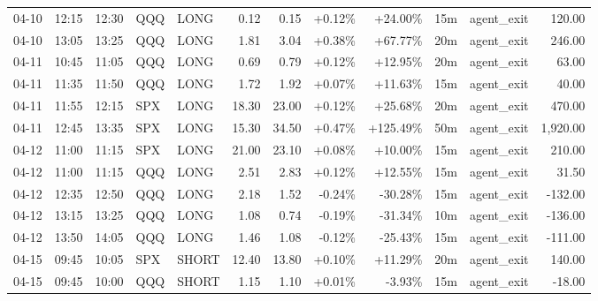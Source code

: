 \documentclass[11pt,a4paper]{article}
\begin{document}
\begin{center}
\begin{longtable}{>{\color{txtmain}}l l l l l r r r r r >{\color{txtmain}}l r}
04-10 & 12:15 & 12:30 & QQQ & LONG & 0.12 & 0.15 & \textcolor{wingreen}{+0.12\%} & \textcolor{wingreen}{+24.00\%} & 15m & agent\_exit & \textcolor{wingreen}{120.00} \\
04-10 & 13:05 & 13:25 & QQQ & LONG & 1.81 & 3.04 & \textcolor{wingreen}{+0.38\%} & \textcolor{wingreen}{+67.77\%} & 20m & agent\_exit & \textcolor{wingreen}{246.00} \\
04-11 & 10:45 & 11:05 & QQQ & LONG & 0.69 & 0.79 & \textcolor{wingreen}{+0.12\%} & \textcolor{wingreen}{+12.95\%} & 20m & agent\_exit & \textcolor{wingreen}{63.00} \\
04-11 & 11:35 & 11:50 & QQQ & LONG & 1.72 & 1.92 & \textcolor{wingreen}{+0.07\%} & \textcolor{wingreen}{+11.63\%} & 15m & agent\_exit & \textcolor{wingreen}{40.00} \\
04-11 & 11:55 & 12:15 & SPX & LONG & 18.30 & 23.00 & \textcolor{wingreen}{+0.12\%} & \textcolor{wingreen}{+25.68\%} & 20m & agent\_exit & \textcolor{wingreen}{470.00} \\
04-11 & 12:45 & 13:35 & SPX & LONG & 15.30 & 34.50 & \textcolor{wingreen}{+0.47\%} & \textcolor{wingreen}{+125.49\%} & 50m & agent\_exit & \textcolor{wingreen}{1,920.00} \\
04-12 & 11:00 & 11:15 & SPX & LONG & 21.00 & 23.10 & \textcolor{wingreen}{+0.08\%} & \textcolor{wingreen}{+10.00\%} & 15m & agent\_exit & \textcolor{wingreen}{210.00} \\
04-12 & 11:00 & 11:15 & QQQ & LONG & 2.51 & 2.83 & \textcolor{wingreen}{+0.12\%} & \textcolor{wingreen}{+12.55\%} & 15m & agent\_exit & \textcolor{wingreen}{31.50} \\
04-12 & 12:35 & 12:50 & QQQ & LONG & 2.18 & 1.52 & \textcolor{lossred}{-0.24\%} & \textcolor{lossred}{-30.28\%} & 15m & agent\_exit & \textcolor{lossred}{-132.00} \\
04-12 & 13:15 & 13:25 & QQQ & LONG & 1.08 & 0.74 & \textcolor{lossred}{-0.19\%} & \textcolor{lossred}{-31.34\%} & 10m & agent\_exit & \textcolor{lossred}{-136.00} \\
04-12 & 13:50 & 14:05 & QQQ & LONG & 1.46 & 1.08 & \textcolor{lossred}{-0.12\%} & \textcolor{lossred}{-25.43\%} & 15m & agent\_exit & \textcolor{lossred}{-111.00} \\
04-15 & 09:45 & 10:05 & SPX & SHORT & 12.40 & 13.80 & \textcolor{wingreen}{+0.10\%} & \textcolor{wingreen}{+11.29\%} & 20m & agent\_exit & \textcolor{wingreen}{140.00} \\
04-15 & 09:45 & 10:00 & QQQ & SHORT & 1.15 & 1.10 & \textcolor{wingreen}{+0.01\%} & \textcolor{lossred}{-3.93\%} & 15m & agent\_exit & \textcolor{lossred}{-18.00} \\

\end{longtable}
\end{center}
\end{document}
